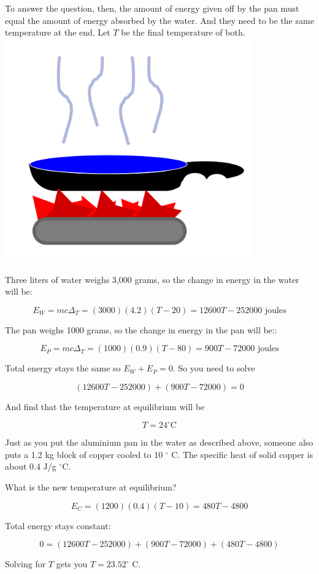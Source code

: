 To answer the question, then, the amount of energy given off by the
pan must equal the amount of energy absorbed by the water. And they
need to be the same temperature at the end.  Let $T$ be the final
temperature of both.
\includegraphics[width=0.8\textwidth]{Specific_Heat_Diagram.png}



Three liters of water weighs 3,000 grams, so the
change in energy in the water will be:

$$E_W = m c \Delta_T = (3000)(4.2)(T - 20) = 12600T - 252000 \text{ joules}$$ 

The pan weighs 1000 grams, so the change in energy in the pan will be::

$$E_P = m c \Delta_T = (1000)(0.9)(T - 80) = 900T - 72000 \text{ joules}$$

Total energy stays the same so $E_W + E_P = 0$.  So you need to solve

$$(12600T - 252000) + (900T - 72000) = 0$$

And find that the temperature at equilibrium will be

$$T = 24^\circ \text{C}$$

\begin{Exercise}[title={Thermal Equilibrium}, label=thermal_equilibrium]

Just as you put the aluminium pan in the water as described above,
someone also puts a 1.2 kg block of copper cooled to 10 $^\circ$ C.
The specific heat of solid copper is about 0.4 J/g $^\circ$C.

What is the new temperature at equilibrium?

\end{Exercise}
\begin{Answer}[ref=thermal_equilibrium]

  $$E_C = (1200)(0.4)(T - 10) = 480T - 4800$$

Total energy stays constant:

$$0 = (12600T - 252000) + (900T - 72000) + (480T - 4800)$$

Solving for $T$ gets you $T = 23.52^\circ$ C.

\end{Answer}

